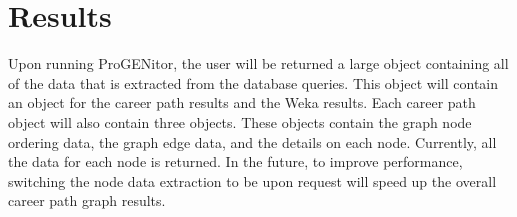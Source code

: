 \chapter{Results}
\label{chap:results}
Upon running ProGENitor, the user will be returned a large object
containing all of the data that is extracted from the database queries.  This
object will contain an object for the career path results and the Weka
results.  Each career path object will also contain three objects.  These
objects contain the graph node ordering data, the graph edge data, and the
details on each node.  Currently, all the data for each node is returned.  In
the future, to improve performance, switching the node data extraction to be
upon request will speed up the overall career path graph results.






